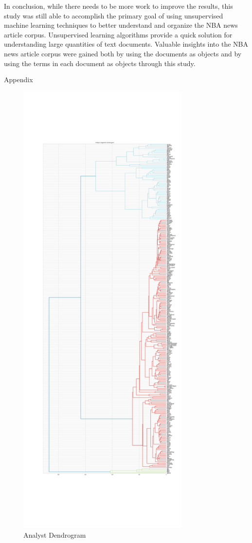 \documentclass[5p,authoryear]{elsarticle}
\begin{document}
In conclusion, while there needs to be more work to improve the results, this study was still able to accomplish the primary goal of using unsupervised machine learning techniques to better understand and organize the NBA news article corpus. 
Unsupervised learning algorithms provide a quick solution for understanding large quantities of text documents.
Valuable insights into the NBA news article corpus were gained both by using the documents as objects and by using the terms in each document as objects through this study. 


\clearpage


Appendix

\begin{figure}[!htb] \centering
	\includegraphics[width=3.4in]{figures/analyst_dendrogram.png}
	\caption[]{Analyst Dendrogram} 
	\label{AnalystDendrogram} 
\end{figure}
\end{document}
